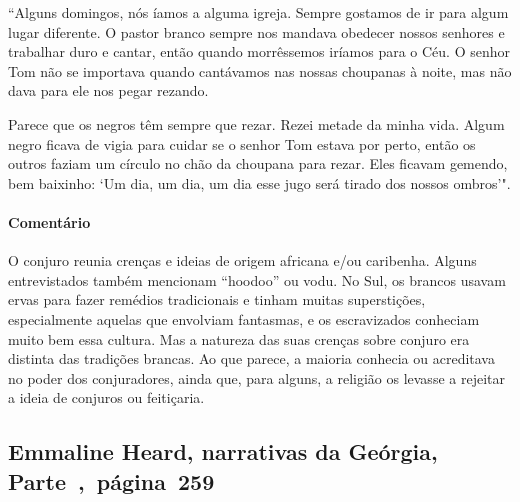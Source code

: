 ``Alguns domingos, nós íamos a alguma igreja. Sempre gostamos de ir para
algum lugar diferente. O pastor branco sempre nos mandava obedecer
nossos senhores e trabalhar duro e cantar, então quando morrêssemos
iríamos para o Céu. O senhor Tom não se importava quando cantávamos nas
nossas choupanas à noite, mas não dava para ele nos pegar rezando.

Parece que os negros têm sempre que rezar. Rezei metade da minha vida.
Algum negro ficava de vigia para cuidar se o senhor Tom estava por
perto, então os outros faziam um círculo no chão da choupana para rezar.
Eles ficavam gemendo, bem baixinho: `Um dia, um dia, um dia esse jugo
será tirado dos nossos ombros'".

\paragraph{Comentário}\quad
{\small
O conjuro reunia crenças e ideias de origem africana e/ou
caribenha. Alguns entrevistados também mencionam ``hoodoo'' ou vodu. No
Sul, os brancos usavam ervas para fazer remédios tradicionais e tinham
muitas superstições, especialmente aquelas que envolviam fantasmas, e os
escravizados conheciam muito bem essa cultura. Mas a natureza das suas
crenças sobre conjuro era distinta das tradições brancas. Ao que parece,
a maioria conhecia ou acreditava no poder dos conjuradores,
ainda que, para alguns, a religião os levasse a rejeitar a
ideia de conjuros ou feitiçaria.
}

\subsection{Emmaline Heard, narrativas da Geórgia, Parte~,~página~259}
\label{ref135}

